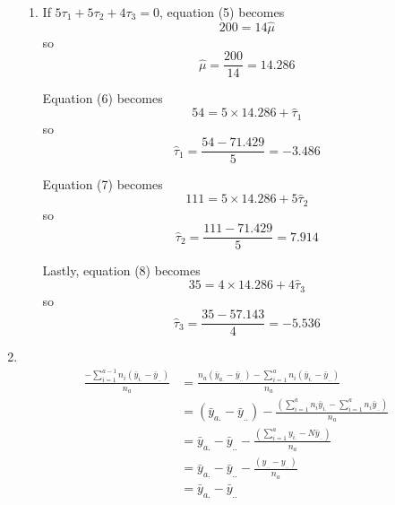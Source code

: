 \documentclass[11pt]{article}
\begin{document}
\begin{enumerate}
\begin{enumerate}
\item %
If \(5\tau_1+5\tau_2+4\tau_3=0\), equation (5) becomes
\begin{equation*}
200=14\widehat\mu
\end{equation*}
so
\begin{equation*}
\widehat\mu=\frac{200}{14}=14.286
\end{equation*}

Equation (6) becomes
\begin{equation*}
54=5\times 14.286+\widehat\tau_1
\end{equation*}
so
\begin{equation*}
\widehat\tau_1=\frac{54-71.429}{5}=-3.486
\end{equation*}

Equation (7) becomes
\begin{equation*}
111=5\times 14.286+5\widehat\tau_2
\end{equation*}
so
\begin{equation*}
\widehat\tau_2=\frac{111-71.429}{5}=7.914
\end{equation*}

Lastly, equation (8) becomes
\begin{equation*}
35=4\times 14.286+4\widehat\tau_3
\end{equation*}
so
\begin{equation*}
\widehat\tau_3=\frac{35-57.143}{4}=-5.536
\end{equation*}

\end{enumerate}

\pagebreak
\setcounter{enumi}{4}
\item ~%
\vspace{-33pt}\begin{align*}
\frac{-\sum_{i=1}^{a-1}n_i\left(\bar{y}_{i.}-\bar{y}_{..}\right)}{n_a}
&=\frac{n_a\left(\bar{y}_{a.}-\bar{y}_{..}\right)-\sum_{i=1}^{a}n_i\left(\bar{y}_{i.}-\bar{y}_{..}\right)}{n_a}\\
&=\left(\bar{y}_{a.}-\bar{y}_{..}\right)-\frac{\left(\sum_{i=1}^{a}n_i\bar{y}_{i.}-\sum_{i=1}^{a}n_i\bar{y}_{..}\right)}{n_a}\\
&=\bar{y}_{a.}-\bar{y}_{..}-\frac{\left(\sum_{i=1}^{a}y_{i.}-N\bar{y}_{..}\right)}{n_a}\\
&=\bar{y}_{a.}-\bar{y}_{..}-\frac{\left(y_{..}-y_{..}\right)}{n_a}\\
&=\bar{y}_{a.}-\bar{y}_{..}
\end{align*}

\end{enumerate}
\end{document}
